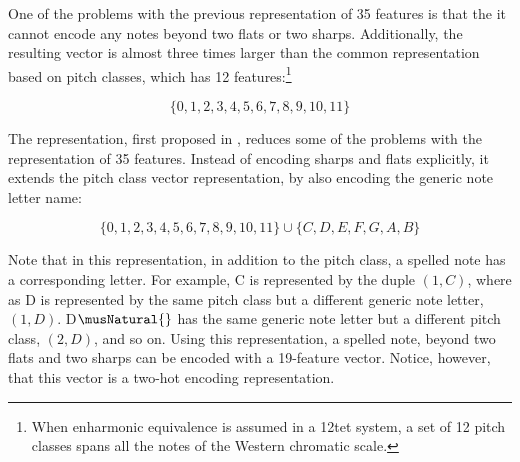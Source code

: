 
One of the problems with the previous representation of 35
features is that the it cannot encode any notes beyond two
flats or two sharps. Additionally, the resulting vector is
almost three times larger than the common representation
based on pitch classes, which has 12 features:\footnote{When
enharmonic equivalence is assumed in a \gls{12tet} system, a
set of 12 pitch classes spans all the notes of the Western
chromatic scale.}

\begin{equation}
    \{0, 1, 2, 3, 4, 5, 6, 7, 8, 9, 10, 11\}
\end{equation}

The representation, first proposed in
\textcite{napoleslopez2021augmentednet}, reduces some of the
problems with the representation of 35 features. Instead of
encoding sharps and flats explicitly, it extends the pitch
class vector representation, by also encoding the generic
note letter name:

\begin{equation}
    \{0, 1, 2, 3, 4, 5, 6, 7, 8, 9, 10, 11\} \cup \{C, D, E, F, G, A, B\}
\end{equation}

Note that in this representation, in addition to the pitch
class, a spelled note has a corresponding letter. For
example, C\musSharp{} is represented by the duple $(1, C)$,
where as D\musFlat{} is represented by the same pitch class
but a different generic note letter, $(1, D)$.
D$\musNatural{}$ has the same generic note letter but a
different pitch class, $(2, D)$, and so on. Using this
representation, a spelled note, beyond two flats and two
sharps can be encoded with a 19-feature vector. Notice,
however, that this vector is a two-hot encoding
representation.
